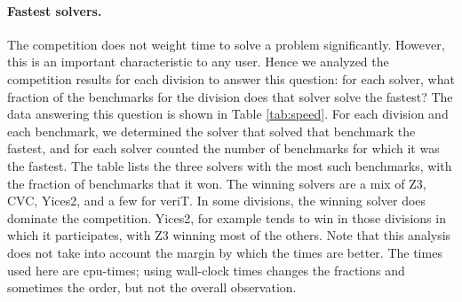 \documentclass[twoside,11pt]{article}
\begin{document}
\paragraph{Fastest solvers.} The competition does not weight time to solve a problem significantly. However, this is an important characteristic to any user. Hence we analyzed the competition results for each division to answer this question: 
for each solver, what fraction of the benchmarks for the division does that solver solve the fastest? 
The data answering this question is shown in Table \ref{tab:speed}. For each division and each benchmark, we determined the solver that solved that benchmark the fastest, and for each solver counted the number of benchmarks for which it was the fastest. The table lists the three solvers with the most such benchmarks, with the fraction of benchmarks that it won.
The winning solvers are a mix of Z3, CVC, Yices2, and a few for veriT. In some divisions, the winning solver does dominate the competition. Yices2, for example tends to win in those divisions in which it participates, with Z3 winning most of the others. Note that this analysis does not take into account the margin by which the times are better. The times used here are cpu-times; using wall-clock times changes the fractions and sometimes the order, but not the overall observation.
\end{document}
